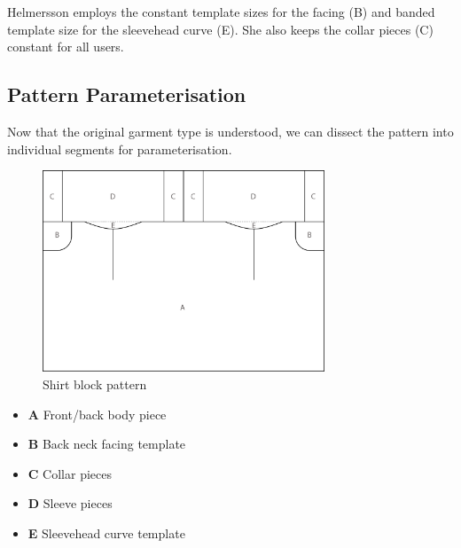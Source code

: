Helmersson employs the constant template sizes for the facing (B) and banded template size for the sleevehead curve (E). She also keeps the collar pieces (C) constant for all users.


\subsection{Pattern Parameterisation}
Now that the original garment type is understood, we can dissect the pattern into individual segments for parameterisation.
\begin{figure} [H] %
    \centering %
    \includegraphics[width = 0.75\textwidth]{Images/originalpattern_whole.png} %
    \caption{Shirt block pattern}
    \label{} %
\end{figure}

\begin{itemize}
    \item \textbf{A} Front/back body piece
    \item \textbf{B} Back neck facing template
    \item \textbf{C} Collar pieces
    \item \textbf{D} Sleeve pieces
    \item \textbf{E} Sleevehead curve template
\end{itemize}

